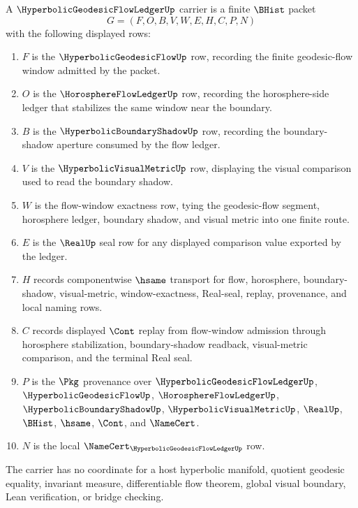 \begin{definition}
\label{def:hyperbolic-geodesic-flow-ledger-carrier}
A $\HyperbolicGeodesicFlowLedgerUp$ carrier is a finite $\BHist$ packet
$$
G=(F,O,B,V,W,E,H,C,P,N)
$$
with the following displayed rows:
\begin{enumerate}
\item $F$ is the $\HyperbolicGeodesicFlowUp$ row, recording the finite geodesic-flow window admitted by the packet.
\item $O$ is the $\HorosphereFlowLedgerUp$ row, recording the horosphere-side ledger that stabilizes the same window near the boundary.
\item $B$ is the $\HyperbolicBoundaryShadowUp$ row, recording the boundary-shadow aperture consumed by the flow ledger.
\item $V$ is the $\HyperbolicVisualMetricUp$ row, displaying the visual comparison used to read the boundary shadow.
\item $W$ is the flow-window exactness row, tying the geodesic-flow segment, horosphere ledger, boundary shadow, and visual metric into one finite route.
\item $E$ is the $\RealUp$ seal row for any displayed comparison value exported by the ledger.
\item $H$ records componentwise $\hsame$ transport for flow, horosphere, boundary-shadow, visual-metric, window-exactness, Real-seal, replay, provenance, and local naming rows.
\item $C$ records displayed $\Cont$ replay from flow-window admission through horosphere stabilization, boundary-shadow readback, visual-metric comparison, and the terminal Real seal.
\item $P$ is the $\Pkg$ provenance over $\HyperbolicGeodesicFlowLedgerUp$, $\HyperbolicGeodesicFlowUp$, $\HorosphereFlowLedgerUp$, $\HyperbolicBoundaryShadowUp$, $\HyperbolicVisualMetricUp$, $\RealUp$, $\BHist$, $\hsame$, $\Cont$, and $\NameCert$.
\item $N$ is the local $\NameCert_{\HyperbolicGeodesicFlowLedgerUp}$ row.
\end{enumerate}
The carrier has no coordinate for a host hyperbolic manifold, quotient geodesic equality, invariant measure, differentiable flow theorem, global visual boundary, Lean verification, or bridge checking.
\end{definition}

